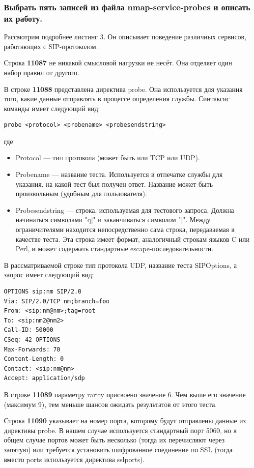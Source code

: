 \subsubsection{Выбрать пять записей из файла nmap-service-probes и описать их работу.}

Рассмотрим подробнее листинг 3. Он описывает поведение различных сервисов, работающих с SIP-протоколом.

Строка \textbf{11087} не никакой смысловой нагрузки не несёт. Она отделяет один набор правил от другого.

В строке \textbf{11088} представлена директива probe. Она используется для указания того, какие данные отправлять в процессе определения службы. Синтаксис команды имеет следующий вид:
\begin{Verbatim}[frame=single]
probe <protocol> <probename> <probesendstring> 
\end{Verbatim}
где
\begin{itemize}
  \item Protocol — тип протокола (может быть или TCP или UDP).
  \item Probename — название теста. Используется в отпечатке службы для указания, на какой тест был получен ответ. Название может быть произвольным (удобным для пользователя). 
  \item Probesendstring — строка, используемая для тестового запроса. Должна начинаться символами "q|" и заканчиваться символом "|". Между ограничителями находится непосредственно сама строка, передаваемая в качестве теста. Эта строка имеет формат, аналогичный строкам языков C или Perl, и может содержать стандартные escape-последовательности.
\end{itemize}

В рассматриваемой строке тип протокола UDP, название теста SIPOptions, а запрос имеет следующий вид:
\begin{Verbatim}[frame=single]
OPTIONS sip:nm SIP/2.0
Via: SIP/2.0/TCP nm;branch=foo
From: <sip:nm@nm>;tag=root
To: <sip:nm2@nm2>
Call-ID: 50000
CSeq: 42 OPTIONS
Max-Forwards: 70
Content-Length: 0
Contact: <sip:nm@nm>
Accept: application/sdp

\end{Verbatim}

В строке \textbf{11089} параметру rarity присвоено значение 6. Чем выше его значение (максимум 9), тем меньше шансов ожидать результатов от этого теста.

Строка \textbf{11090} указывает на номер порта, которому будут отправлены данные из директивы probe. В нашем случае используется стандартный порт 5060, но  в общем случае портов может быть несколько (тогда их перечисляют через запятую) или требуется установить шифрованное соединение по SSL (тогда вместо ports используется директива sslports).

